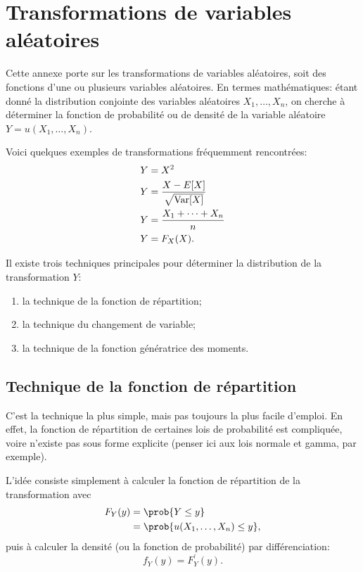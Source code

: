 \chapter{Transformations de variables aléatoires}
\label{chap:rappels_transformations}

Cette annexe porte sur les transformations de variables aléatoires,
soit des fonctions d'une ou plusieurs variables aléatoires. En termes
mathématiques: étant donné la distribution conjointe des variables
aléatoires $X_1, \dots, X_n$, on cherche à déterminer la fonction de
probabilité ou de densité de la variable aléatoire $Y = u(X_1, \dots,
X_n)$.

Voici quelques exemples de transformations fréquemment rencontrées:
\begin{align*}
  Y &= X^2 \\
  Y &= \frac{X - E [ X ]}{\sqrt{\mathrm{Var} [ X ]}} \\
  Y &= \frac{X_1 + \dots + X_n}{n} \\
  Y &= F_X(X).
\end{align*}

Il existe trois techniques principales pour déterminer la distribution
de la transformation $Y$:
\begin{enumerate}
\item la technique de la fonction de répartition;
\item la technique du changement de variable;
\item la technique de la fonction génératrice des moments.
\end{enumerate}


\section{Technique de la fonction de répartition}

C'est la technique la plus simple, mais pas toujours la plus facile
d'emploi. En effet, la fonction de répartition de certaines lois de
probabilité est compliquée, voire n'existe pas sous forme explicite
(penser ici aux lois normale et gamma, par exemple).

L'idée consiste simplement à calculer la fonction de répartition de la
transformation avec
\begin{align*}
  F_Y(y)
  &= \prob{Y \leq y} \\
  &= \prob{u(X_1, \dots, X_n) \leq y},
\end{align*}
puis à calculer la densité (ou la fonction de probabilité) par
différenciation:
\begin{displaymath}
  f_Y(y) = F_Y^\prime(y).
\end{displaymath}


